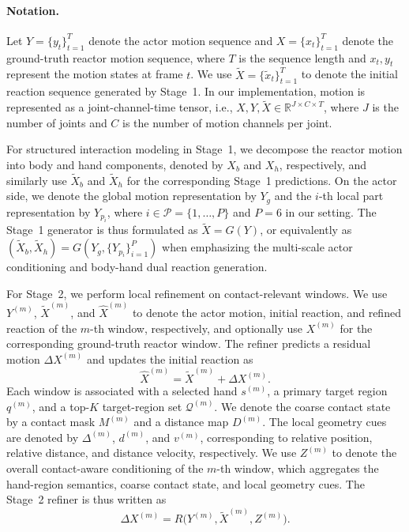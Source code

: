 \paragraph{Notation.}
Let $Y=\{y_t\}_{t=1}^{T}$ denote the actor motion sequence and $X=\{x_t\}_{t=1}^{T}$ denote the ground-truth reactor motion sequence, where $T$ is the sequence length and $x_t, y_t$ represent the motion states at frame $t$. We use $\tilde{X}=\{\tilde{x}_t\}_{t=1}^{T}$ to denote the initial reaction sequence generated by Stage~1. In our implementation, motion is represented as a joint-channel-time tensor, i.e., $X, Y, \tilde{X}\in\mathbb{R}^{J\times C\times T}$, where $J$ is the number of joints and $C$ is the number of motion channels per joint.

For structured interaction modeling in Stage~1, we decompose the reactor motion into body and hand components, denoted by $X_b$ and $X_h$, respectively, and similarly use $\tilde{X}_b$ and $\tilde{X}_h$ for the corresponding Stage~1 predictions. On the actor side, we denote the global motion representation by $Y_g$ and the $i$-th local part representation by $Y_{p_i}$, where $i\in\mathcal{P}=\{1,\dots,P\}$ and $P=6$ in our setting. The Stage~1 generator is thus formulated as $\tilde{X}=G(Y)$, or equivalently as $(\tilde{X}_b,\tilde{X}_h)=G(Y_g,\{Y_{p_i}\}_{i=1}^{P})$ when emphasizing the multi-scale actor conditioning and body-hand dual reaction generation.

For Stage~2, we perform local refinement on contact-relevant windows. We use $Y^{(m)}$, $\tilde{X}^{(m)}$, and $\hat{X}^{(m)}$ to denote the actor motion, initial reaction, and refined reaction of the $m$-th window, respectively, and optionally use $X^{(m)}$ for the corresponding ground-truth reactor window. The refiner predicts a residual motion $\Delta X^{(m)}$ and updates the initial reaction as
\[
\hat{X}^{(m)} = \tilde{X}^{(m)} + \Delta X^{(m)}.
\]
Each window is associated with a selected hand $s^{(m)}$, a primary target region $q^{(m)}$, and a top-$K$ target-region set $\mathcal{Q}^{(m)}$. We denote the coarse contact state by a contact mask $M^{(m)}$ and a distance map $D^{(m)}$. The local geometry cues are denoted by $\Delta^{(m)}$, $d^{(m)}$, and $v^{(m)}$, corresponding to relative position, relative distance, and distance velocity, respectively. We use $Z^{(m)}$ to denote the overall contact-aware conditioning of the $m$-th window, which aggregates the hand-region semantics, coarse contact state, and local geometry cues. The Stage~2 refiner is thus written as
\[
\Delta X^{(m)} = R\big(Y^{(m)}, \tilde{X}^{(m)}, Z^{(m)}\big).
\]
